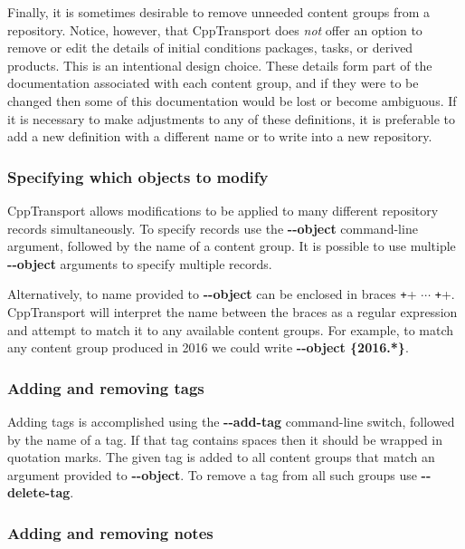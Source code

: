 \documentclass[11pt,a4paper]{article}
\newcommand{\packagefont}{\sffamily}
\newcommand{\CppTransport}{{\packagefont CppTransport}}
\newcommand{\option}[1]{{\ttfamily\bfseries\small #1}}
\begin{document}
Finally, it is sometimes desirable to remove unneeded content groups from a repository.
Notice, however, that {\CppTransport} does \emph{not} offer an option to remove
or edit
the details of initial conditions packages, tasks, or derived products.
This is an intentional design choice.
These details form part of the documentation associated with each content group,
and if they were to be changed then some of this documentation would be lost
or become ambiguous.
If it is necessary to make adjustments to any of these definitions, it is
preferable to add a new definition with a different name or to write into a new
repository.

\subsubsection{Specifying which objects to modify}
\label{sec:specify-objects}
{\CppTransport} allows modifications to be applied to many different
repository records simultaneously.
To specify records use the \option{{-}{-}object} command-line argument,
followed by the name of a content group.
It is possible to use multiple \option{{-}{-}object} arguments to specify
multiple records.

Alternatively, to name provided to \option{{-}{-}object} can be
enclosed in braces
\texttt+{+
$\cdots$
\texttt+}+.
{\CppTransport} will interpret the name between the braces
as a regular expression and attempt to match it to any available content groups.
For example, to match any content group produced in 2016 we could write
\option{{-}{-}object \{2016.*\}}.

\subsubsection{Adding and removing tags}
\label{sec:add-remove-tags}

Adding tags is accomplished using the
\option{{-}{-}add-tag} command-line switch,
followed by the name of a tag. If that tag contains spaces then it should be
wrapped in quotation marks.
The given tag is added to all content groups that match
an argument provided to \option{{-}{-}object}.
To remove a tag from all such groups use
\option{{-}{-}delete-tag}.

\subsubsection{Adding and removing notes}
\label{sec:add-remove-notes}
\end{document}
